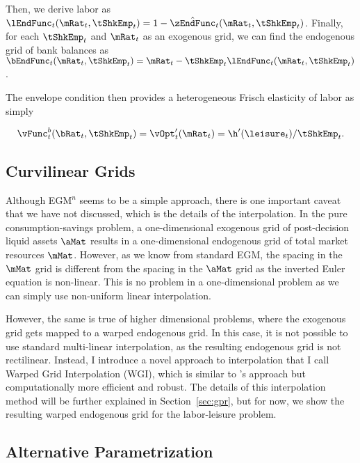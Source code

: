 \documentclass[\econtexRoot/SequentialEGM]{subfiles}
\begin{document}
Then, we derive labor as $\lEndFunc_{t}(\mRat_{t}, \tShkEmp_{t}) = 1 -
  \hat{\zEndFunc}_{t}(\mRat_{t}, \tShkEmp_{t})$. Finally, for each
$\tShkEmp_{t}$ and
$\mRat_{t}$ as an exogenous grid, we can find the endogenous grid of bank
balances as $\bEndFunc_{t}(\mRat_{t}, \tShkEmp_{t}) = \mRat_{t} -
  \tShkEmp_{t}\lEndFunc_{t}(\mRat_{t}, \tShkEmp_{t})$.

The envelope condition then provides a heterogeneous Frisch elasticity of labor as simply

\begin{equation}
  \vFunc_{t}^{b}(\bRat_{t}, \tShkEmp_{t}) = \vOpt_{t}'(\mRat_{t}) =
  \h'(\leisure_{t})/\tShkEmp_{t}.
\end{equation}

\subsection{Curvilinear Grids}

Although EGM$^n$ seems to be a simple approach, there is one important caveat that we have not discussed, which is the details of the interpolation. In the pure consumption-savings problem, a one-dimensional exogenous grid of post-decision liquid assets $\aMat$ results in a one-dimensional endogenous grid of total market resources $\mMat$. However, as we know from standard EGM, the spacing in the $\mMat$ grid is different from the spacing in the $\aMat$ grid as the inverted Euler equation is non-linear. This is no problem in a one-dimensional problem as we can simply use non-uniform linear interpolation.

However, the same is true of higher dimensional problems, where the exogenous grid gets mapped to a warped endogenous grid. In this case, it is not possible to use standard multi-linear interpolation, as the resulting endogenous grid is not rectilinear. Instead, I introduce a novel approach to interpolation that I call Warped Grid Interpolation (WGI), which is similar to \cite{White2015}'s approach but computationally more efficient and robust. The details of this interpolation method will be further explained in Section~\ref{sec:gpr}, but for now, we show the resulting warped endogenous grid for the labor-leisure problem.


\subsection{Alternative Parametrization}
\end{document}
